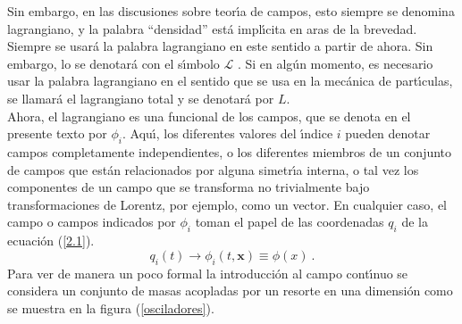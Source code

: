 \noindent
Sin embargo, en las discusiones sobre teor\'{\i}a de campos, esto siempre se denomina lagrangiano, y la palabra ``densidad'' est\'{a} impl\'{\i}cita en aras de la brevedad. Siempre se usar\'{a} la palabra lagrangiano en este sentido a partir de ahora. Sin embargo, lo se denotar\'{a} con el s\'{\i}mbolo $\mathcal{L}$ . Si en alg\'{u}n momento, es necesario usar la palabra lagrangiano en el sentido que se usa en la mec\'{a}nica de part\'{\i}culas, se llamar\'{a} el lagrangiano total y se denotar\'{a} por $L$.\\

\noindent
Ahora, el lagrangiano es una funcional de los campos, que se denota en el presente texto por $\phi_{i}$. Aqu\'{\i}, los diferentes valores del \'{\i}ndice $i$ pueden denotar campos completamente independientes, o los diferentes miembros de un conjunto de campos que est\'{a}n relacionados por alguna simetr\'{\i}a interna, o tal vez los componentes de un campo que se transforma no trivialmente bajo transformaciones de Lorentz, por ejemplo, como un vector. En cualquier caso,
el campo o campos indicados por $\phi_{i}$ toman el papel de las coordenadas $q_{i}$ de la ecuación (\ref{2.1}).\\

\begin{equation}
    q_{i}(t) \rightarrow \phi_{i}(t,\mathbf{x}) \equiv \phi(x)~. 
\end{equation}
\noindent
Para ver de manera un poco formal la introducci\'{o}n al campo cont\'{\i}nuo
se considera un conjunto de masas acopladas por un resorte en una dimensi\'{o}n como se muestra en la figura (\ref{osciladores}).\\


